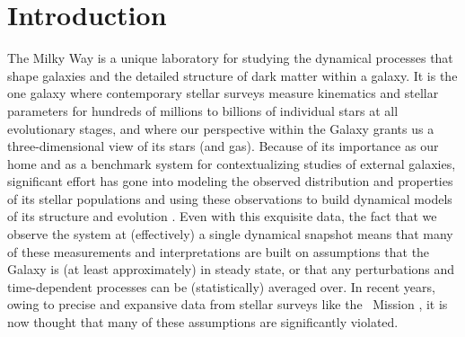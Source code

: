 \section{Introduction} \label{sec:intro}

The Milky Way is a unique laboratory for studying the dynamical processes that shape galaxies and the detailed structure of dark matter within a galaxy.
It is the one galaxy where contemporary stellar surveys measure kinematics and stellar parameters for hundreds of millions to billions of individual stars at all evolutionary stages, and where our perspective within the Galaxy grants us a three-dimensional view of its stars (and gas).
Because of its importance as our home and as a benchmark system for contextualizing studies of external galaxies, significant effort has gone into modeling the observed distribution and properties of its stellar populations \citep[for a review,][]{Bland-Hawthron:2016} and using these observations to build dynamical models of its structure and evolution \citep{TODO galactic dynamics summary}.
Even with this exquisite data, the fact that we observe the system at (effectively) a single dynamical snapshot means that many of these measurements and interpretations are built on assumptions that the Galaxy is (at least approximately) in steady state, or that any perturbations and time-dependent processes can be (statistically) averaged over.
In recent years, owing to precise and expansive data from stellar surveys like the \gaia\ Mission \citep{Gaia-overview}, it is now thought that many of these assumptions are significantly violated.


